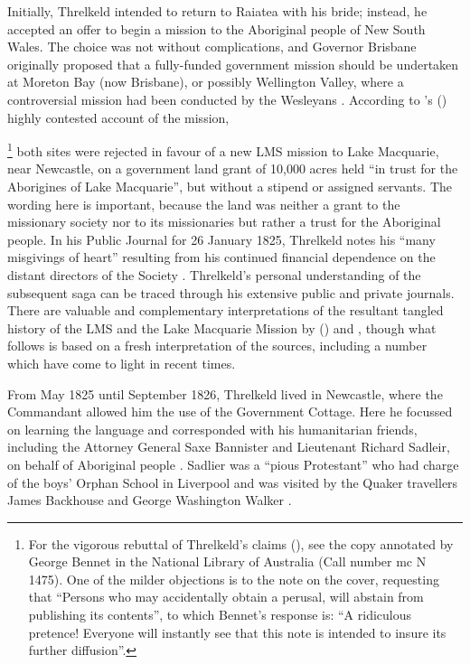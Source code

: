 Initially, Threlkeld intended to return to Raiatea with his bride; instead, he accepted an offer to begin a mission to the Aboriginal people of New South Wales. The choice was not without complications, and Governor Brisbane originally proposed that a fully-funded government mission should be undertaken at Moreton Bay (now Brisbane), or possibly Wellington Valley, where a controversial mission had been conducted by the Wesleyans \citep{roberts_beong_2009}. According to \citeauthor{threlkeld_statement_1828}’s (\citeyear{threlkeld_statement_1828}) highly contested account of the mission,{\enlargethispage{\baselineskip}\footnote{For the vigorous rebuttal of Threlkeld’s claims (\citeyear{threlkeld_statement_1828}), see the copy annotated by George Bennet in the National Library of Australia (Call number mc N 1475). One of the milder objections is to the note on the cover, requesting that “Persons who may accidentally obtain a perusal, will abstain from publishing its contents”, to which Bennet’s response is: “A ridiculous pretence! Everyone will instantly see that this note is intended to insure its further diffusion”.} both sites were rejected in favour of a new LMS mission to Lake Macquarie, near Newcastle, on a government land grant of 10,000 acres held “in trust for the Aborigines of Lake Macquarie”, but without a stipend or assigned servants. The wording here is important, because the land was neither a grant to the missionary society nor to its missionaries but rather a trust for the Aboriginal people. In his Public Journal for 26 January 1825, Threlkeld notes his “many misgivings of heart” resulting from his continued financial dependence on the distant directors of the Society \citep[85]{gunson_australian_1974a}. Threlkeld’s personal understanding of the subsequent saga can be traced through his extensive public and private journals. There are valuable and complementary interpretations of the resultant tangled history of the LMS and the Lake Macquarie Mission by \citeauthor{gunson_australian_1974a} (\citeyear{gunson_australian_1974a, gunson_australian_1974b}) and \citet{johnston_blister_2006}, though what follows is based on a fresh interpretation of the sources, including a number which have come to light in recent times.

From May 1825 until September 1826, Threlkeld lived in Newcastle, where the Commandant allowed him the use of the Government Cottage. Here he focussed on learning the language and corresponded with his humanitarian friends, including the Attorney General Saxe Bannister and Lieutenant Richard Sadleir, on behalf of Aboriginal people \citep[94]{gunson_australian_1974a}. Sadlier was a “pious Protestant” who had charge of the boys’ Orphan School in Liverpool and was visited by the Quaker travellers James Backhouse and George Washington Walker \citep[5]{backhouse_extracts_1838}.

}
